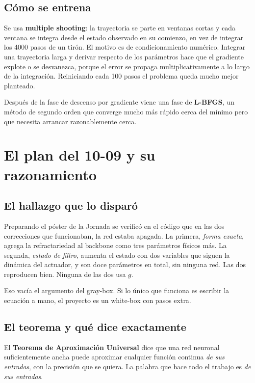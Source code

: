 \documentclass[11pt,a4paper]{article}
\newcommand{\term}[1]{\textbf{#1}}
\begin{document}
\subsection{Cómo se entrena}

Se usa \term{multiple shooting}: la trayectoria se parte en ventanas cortas y
cada ventana se integra desde el estado observado en su comienzo, en vez de
integrar los 4000 pasos de un tirón. El motivo es de condicionamiento numérico.
Integrar una trayectoria larga y derivar respecto de los parámetros hace que el
gradiente explote o se desvanezca, porque el error se propaga multiplicativamente
a lo largo de la integración. Reiniciando cada 100 pasos el problema queda mucho
mejor planteado.

Después de la fase de descenso por gradiente viene una fase de \term{L-BFGS}, un
método de segundo orden que converge mucho más rápido cerca del mínimo pero que
necesita arrancar razonablemente cerca.

\section{El plan del 10-09 y su razonamiento}

\subsection{El hallazgo que lo disparó}

Preparando el póster de la Jornada se verificó en el código que en las dos
correcciones que funcionaban, la red estaba apagada. La primera,
\emph{forma exacta}, agrega la refractariedad al backbone como tres parámetros
físicos más. La segunda, \emph{estado de filtro}, aumenta el estado con dos
variables que siguen la dinámica del actuador, y son doce parámetros en total,
sin ninguna red. Las dos reproducen bien. Ninguna de las dos usa $g$.

Eso vacía el argumento del gray-box. Si lo único que funciona es escribir la
ecuación a mano, el proyecto es un white-box con pasos extra.

\subsection{El teorema y qué dice exactamente}

El \term{Teorema de Aproximación Universal} dice que una red neuronal
suficientemente ancha puede aproximar cualquier función continua \emph{de sus
entradas}, con la precisión que se quiera. La palabra que hace todo el trabajo
es \emph{de sus entradas}.
\end{document}
